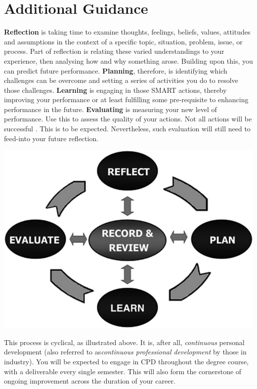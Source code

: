 \documentclass{../../fal_assignment}
\begin{document}
\section*{Additional Guidance}

\textbf{Reflection} is taking time to examine thoughts, feelings, beliefs, values, attitudes and assumptions in the context of a specific topic, situation, problem, issue, or process. Part of reflection is relating these varied understandings to your experience, then analysing how and why something arose. Building upon this, you can predict future performance. \textbf{Planning}, therefore, is identifying which challenges can be overcome and setting a series of activities you do to resolve those challenges. \textbf{Learning} is engaging in those SMART actions, thereby improving your performance or at least fulfilling some pre-requisite to enhancing performance in the future. \textbf{Evaluating} is measuring your new level of performance. Use this to assess the quality of your actions. Not all actions will be successful . This is to be expected. Nevertheless, such evaluation will still need to feed-into your future reflection.

\begin{center}
    \includegraphics[scale=3]{ajpe798112-fig1} 
\end{center}

This process is cyclical, as illustrated above. It is, after all, \textit{continuous} personal development (also referred to as\textit{continuous professional development} by those in industry). You will be expected to engage in CPD throughout the degree course, with a deliverable every single semester. This will also form the cornerstone of ongoing improvement across the duration of your career.
\end{document}
